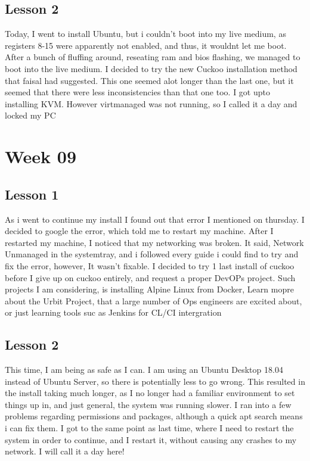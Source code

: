 \documentclass{article}
\begin{document}
\subsection{Lesson 2}
Today, I went to install Ubuntu, but i couldn't boot into my live medium, as registers 8-15 were apparently not enabled, and thus, it wouldnt let me boot. After a bunch of fluffing around, reseating ram and bios flashing, we managed to boot into the live medium. I decided to try the new Cuckoo installation method that faisal had suggested. This one seemed alot longer than the last one, but it seemed that there were less inconsistencies than that one too. I got upto installing KVM. However virtmanaged was not running, so I called it a day and locked my PC 

\section{Week 09}
\subsection{Lesson 1}
As i went to continue my install I found out that error I mentioned on thursday. I decided to google the error, which told me to restart my machine. After I restarted my machine, I noticed that my networking was broken. It said, Network Unmanaged in the systemtray, and i followed every guide i could find to try and fix the error, however, It wasn't fixable. I decided to try 1 last install of cuckoo before I give up on cuckoo entirely, and request a proper DevOPs project. Such projects I am considering, is installing Alpine Linux from Docker, Learn mopre about the Urbit Project, that a large number of Ops engineers are excited about, or just learning tools suc as Jenkins for CL/CI intergration  
\subsection{Lesson 2}
This time, I am being as safe as I can. I am using an Ubuntu Desktop 18.04 instead of Ubuntu Server, so there is potentially less to go wrong. This resulted in the install taking much longer, as I no longer had a familiar environment to set things up in, and just general, the system was running slower. I ran into a few problems regarding permissions and packages, although a quick apt search means i can fix them. I got to the same point as last time, where I need to restart the system in order to continue, and I restart it, without causing any crashes to my network. I will call it a day here!
\end{document}
